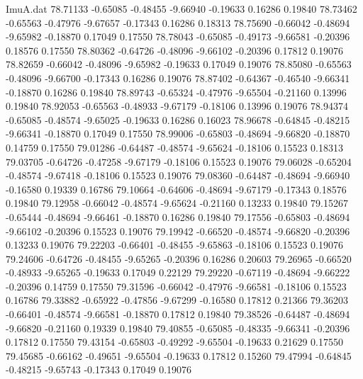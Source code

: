 \begin{filecontents}{ImuA.dat}
  78.71133   -0.65085   -0.48455   -9.66940   -0.19633    0.16286    0.19840
  78.73462   -0.65563   -0.47976   -9.67657   -0.17343    0.16286    0.18313
  78.75690   -0.66042   -0.48694   -9.65982   -0.18870    0.17049    0.17550
  78.78043   -0.65085   -0.49173   -9.66581   -0.20396    0.18576    0.17550
  78.80362   -0.64726   -0.48096   -9.66102   -0.20396    0.17812    0.19076
  78.82659   -0.66042   -0.48096   -9.65982   -0.19633    0.17049    0.19076
  78.85080   -0.65563   -0.48096   -9.66700   -0.17343    0.16286    0.19076
  78.87402   -0.64367   -0.46540   -9.66341   -0.18870    0.16286    0.19840
  78.89743   -0.65324   -0.47976   -9.65504   -0.21160    0.13996    0.19840
  78.92053   -0.65563   -0.48933   -9.67179   -0.18106    0.13996    0.19076
  78.94374   -0.65085   -0.48574   -9.65025   -0.19633    0.16286    0.16023
  78.96678   -0.64845   -0.48215   -9.66341   -0.18870    0.17049    0.17550
  78.99006   -0.65803   -0.48694   -9.66820   -0.18870    0.14759    0.17550
  79.01286   -0.64487   -0.48574   -9.65624   -0.18106    0.15523    0.18313
  79.03705   -0.64726   -0.47258   -9.67179   -0.18106    0.15523    0.19076
  79.06028   -0.65204   -0.48574   -9.67418   -0.18106    0.15523    0.19076
  79.08360   -0.64487   -0.48694   -9.66940   -0.16580    0.19339    0.16786
  79.10664   -0.64606   -0.48694   -9.67179   -0.17343    0.18576    0.19840
  79.12958   -0.66042   -0.48574   -9.65624   -0.21160    0.13233    0.19840
  79.15267   -0.65444   -0.48694   -9.66461   -0.18870    0.16286    0.19840
  79.17556   -0.65803   -0.48694   -9.66102   -0.20396    0.15523    0.19076
  79.19942   -0.66520   -0.48574   -9.66820   -0.20396    0.13233    0.19076
  79.22203   -0.66401   -0.48455   -9.65863   -0.18106    0.15523    0.19076
  79.24606   -0.64726   -0.48455   -9.65265   -0.20396    0.16286    0.20603
  79.26965   -0.66520   -0.48933   -9.65265   -0.19633    0.17049    0.22129
  79.29220   -0.67119   -0.48694   -9.66222   -0.20396    0.14759    0.17550
  79.31596   -0.66042   -0.47976   -9.66581   -0.18106    0.15523    0.16786
  79.33882   -0.65922   -0.47856   -9.67299   -0.16580    0.17812    0.21366
  79.36203   -0.66401   -0.48574   -9.66581   -0.18870    0.17812    0.19840
  79.38526   -0.64487   -0.48694   -9.66820   -0.21160    0.19339    0.19840
  79.40855   -0.65085   -0.48335   -9.66341   -0.20396    0.17812    0.17550
  79.43154   -0.65803   -0.49292   -9.65504   -0.19633    0.21629    0.17550
  79.45685   -0.66162   -0.49651   -9.65504   -0.19633    0.17812    0.15260
  79.47994   -0.64845   -0.48215   -9.65743   -0.17343    0.17049    0.19076

\end{filecontents}
